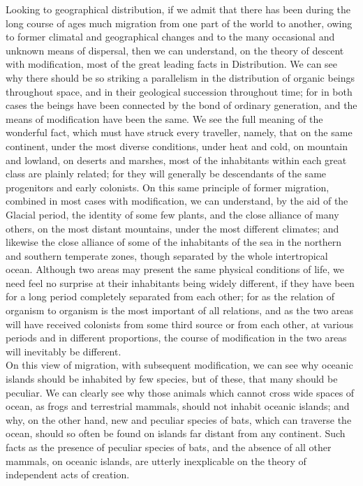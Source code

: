 \indent Looking to geographical distribution, if we admit that there has been during the long course of ages much migration from one part of the world to another, owing to former climatal and geographical changes and to the many occasional and unknown means of dispersal, then we can understand, on the theory of descent with modification, most of the great leading facts in Distribution. We can see why there should be so striking a parallelism in the distribution of organic beings throughout space, and in their geological succession throughout time; for in both cases the beings have been connected by the bond of ordinary generation, and the means of modification have been the same. We see the full meaning of the wonderful fact, which must have struck every traveller, namely, that on the same continent, under the most diverse conditions, under heat and cold, on mountain and lowland, on deserts and marshes, most of the inhabitants within each great class are plainly related; for they will generally be descendants of the same progenitors and early colonists. On this same principle of former migration, combined in most cases with modification, we can understand, by the aid of the Glacial period, the identity of some few plants, and the close alliance of many others, on the most distant mountains, under the most different climates; and likewise the close alliance of some of the inhabitants of the sea in the northern and southern temperate zones, though separated by the whole intertropical ocean. Although two areas may present the same physical conditions of life, we need feel no surprise at their inhabitants being widely different, if they have been for a long period completely separated from each other; for as the relation of organism to organism is the most important of all relations, and as the two areas will have received colonists from some third source or from each other, at various periods and in different proportions, the course of modification in the two areas will inevitably be different.~\\
\indent On this view of migration, with subsequent modification, we can see why oceanic islands should be inhabited by few species, but of these, that many should be peculiar. We can clearly see why those animals which cannot cross wide spaces of ocean, as frogs and terrestrial mammals, should not inhabit oceanic islands; and why, on the other hand, new and peculiar species of bats, which can traverse the ocean, should so often be found on islands far distant from any continent. Such facts as the presence of peculiar species of bats, and the absence of all other mammals, on oceanic islands, are utterly inexplicable on the theory of independent acts of creation.~\\
